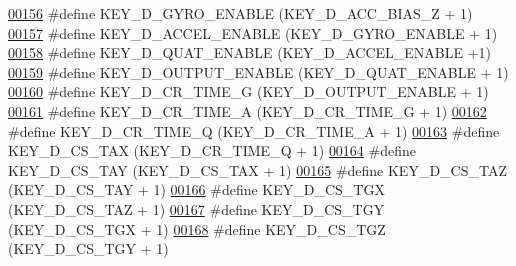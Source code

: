 \begin{DoxyCode}
\hypertarget{dmp_key_8h_source.tex_l00156}{}\hyperlink{dmp_key_8h_a0dd3a972304419a5326d112028fd83a6}{00156} \textcolor{preprocessor}{#define KEY\_D\_GYRO\_ENABLE               (KEY\_D\_ACC\_BIAS\_Z + 1)}
\hypertarget{dmp_key_8h_source.tex_l00157}{}\hyperlink{dmp_key_8h_ad0155ccde405af83a10eb2793b33b56a}{00157} \textcolor{preprocessor}{#define KEY\_D\_ACCEL\_ENABLE              (KEY\_D\_GYRO\_ENABLE + 1)}
\hypertarget{dmp_key_8h_source.tex_l00158}{}\hyperlink{dmp_key_8h_a6fa7c9b483cce82b1ec3a36fe5d0b9ab}{00158} \textcolor{preprocessor}{#define KEY\_D\_QUAT\_ENABLE               (KEY\_D\_ACCEL\_ENABLE +1)}
\hypertarget{dmp_key_8h_source.tex_l00159}{}\hyperlink{dmp_key_8h_ae710188d91f576d2cca5e9a492cb853d}{00159} \textcolor{preprocessor}{#define KEY\_D\_OUTPUT\_ENABLE             (KEY\_D\_QUAT\_ENABLE + 1)}
\hypertarget{dmp_key_8h_source.tex_l00160}{}\hyperlink{dmp_key_8h_afa242687c09ebc82383746057ddb3350}{00160} \textcolor{preprocessor}{#define KEY\_D\_CR\_TIME\_G                 (KEY\_D\_OUTPUT\_ENABLE + 1)}
\hypertarget{dmp_key_8h_source.tex_l00161}{}\hyperlink{dmp_key_8h_ac676932e91ed7a745409c566be915de1}{00161} \textcolor{preprocessor}{#define KEY\_D\_CR\_TIME\_A                 (KEY\_D\_CR\_TIME\_G + 1)}
\hypertarget{dmp_key_8h_source.tex_l00162}{}\hyperlink{dmp_key_8h_a992ffb967c87f52515786285afd0294c}{00162} \textcolor{preprocessor}{#define KEY\_D\_CR\_TIME\_Q                 (KEY\_D\_CR\_TIME\_A + 1)}
\hypertarget{dmp_key_8h_source.tex_l00163}{}\hyperlink{dmp_key_8h_af1885d9c431f01f338c8ba949c3b5ab7}{00163} \textcolor{preprocessor}{#define KEY\_D\_CS\_TAX                    (KEY\_D\_CR\_TIME\_Q + 1)}
\hypertarget{dmp_key_8h_source.tex_l00164}{}\hyperlink{dmp_key_8h_ac8ea06ca1df86193290ed973995b600b}{00164} \textcolor{preprocessor}{#define KEY\_D\_CS\_TAY                    (KEY\_D\_CS\_TAX + 1)}
\hypertarget{dmp_key_8h_source.tex_l00165}{}\hyperlink{dmp_key_8h_aca381a83beb9fe70bc1f691f46af90da}{00165} \textcolor{preprocessor}{#define KEY\_D\_CS\_TAZ                    (KEY\_D\_CS\_TAY + 1)}
\hypertarget{dmp_key_8h_source.tex_l00166}{}\hyperlink{dmp_key_8h_a0cc1bbdb7c88767dde6752df7eceb9a1}{00166} \textcolor{preprocessor}{#define KEY\_D\_CS\_TGX                    (KEY\_D\_CS\_TAZ + 1)}
\hypertarget{dmp_key_8h_source.tex_l00167}{}\hyperlink{dmp_key_8h_aaf379b295a074e258f3b2830899c8dd1}{00167} \textcolor{preprocessor}{#define KEY\_D\_CS\_TGY                    (KEY\_D\_CS\_TGX + 1)}
\hypertarget{dmp_key_8h_source.tex_l00168}{}\hyperlink{dmp_key_8h_a01094a31362254939019ae7377499c83}{00168} \textcolor{preprocessor}{#define KEY\_D\_CS\_TGZ                    (KEY\_D\_CS\_TGY + 1)}

\end{DoxyCode}
